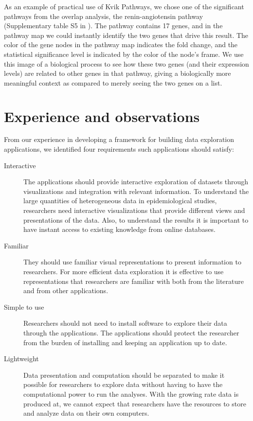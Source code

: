 As an example of practical use of Kvik Pathways, we chose one of the
significant pathways from the overlap analysis, the renin-angiotensin
pathway (Supplementary table S5 in \cite{olsen2013plasma}). The pathway
contains 17 genes, and in the pathway map we could instantly identify the
two genes that drive this result. The color of the gene nodes in the pathway
map indicates the fold change, and the statistical significance level is
indicated by the color of the node's frame.  We use this image of a
biological process to see how these two genes (and their expression levels)
are related to other genes in that pathway, giving a biologically more
meaningful context as compared to merely seeing the two genes on a list.

\section{Experience and observations} 

From our experience in developing a framework for building data exploration
applications, we identified four requirements such applications should satisfy: 

\begin{description} 
\item[Interactive] The applications should provide interactive exploration
    of datasets through visualizations and integration with relevant
    information. 
    To understand the large quantities of heterogeneous data in
    epidemiological studies, researchers need interactive visualizations
    that provide different views and presentations of the data. Also, to
    understand the results it is important to have instant access to
    existing knowledge from online databases. 
    
\item[Familiar] They should use familiar visual representations to present
    information to researchers. For more efficient data exploration it is 
    effective to use representations that researchers are familiar with both from
    the literature and from other applications. 
    
\item[Simple to use] Researchers should not need to install software to
    explore their data through the applications. The applications should 
    protect the researcher from the burden of installing and keeping an
    application up to date. 
    
\item[Lightweight] Data presentation and computation should be separated
    to make it possible for researchers to explore data without having to
    have the computational power to run the analyses. With the growing rate
    data is produced at, we cannot expect that researchers have the resources to
    store and analyze data on their own computers. 
    
\end{description}


